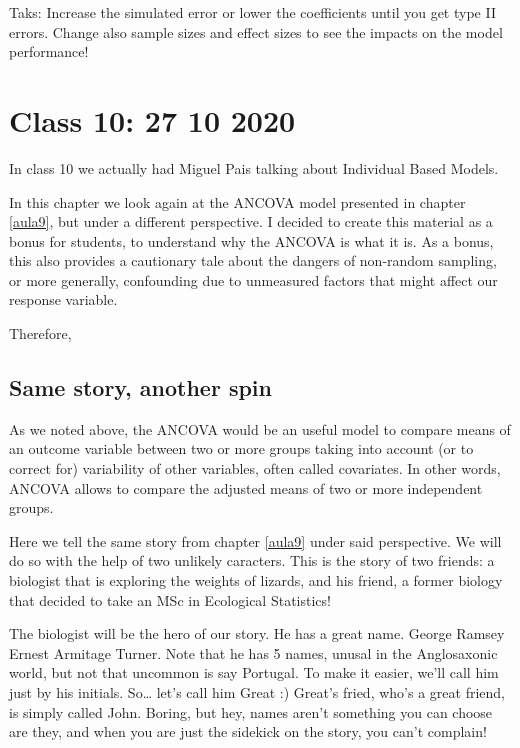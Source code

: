 \documentclass[
]{book}
\begin{document}
Taks: Increase the simulated error or lower the coefficients until you get type II errors. Change also sample sizes and effect sizes to see the impacts on the model performance!

\hypertarget{aula10}{%
\chapter{Class 10: 27 10 2020}\label{aula10}}

In class 10 we actually had Miguel Pais talking about Individual Based Models.

In this chapter we look again at the ANCOVA model presented in chapter \ref{aula9}, but under a different perspective. I decided to create this material as a bonus for students, to understand why the ANCOVA is what it is. As a bonus, this also provides a cautionary tale about the dangers of non-random sampling, or more generally, confounding due to unmeasured factors that might affect our response variable.

Therefore,

\hypertarget{same-story-another-spin}{%
\section{Same story, another spin}\label{same-story-another-spin}}

As we noted above, the ANCOVA would be an useful model to compare means of an outcome variable between two or more groups taking into account (or to correct for) variability of other variables, often called covariates. In other words, ANCOVA allows to compare the adjusted means of two or more independent groups.

Here we tell the same story from chapter \ref{aula9} under said perspective. We will do so with the help of two unlikely caracters. This is the story of two friends: a biologist that is exploring the weights of lizards, and his friend, a former biology that decided to take an MSc in Ecological Statistics!

The biologist will be the hero of our story. He has a great name. George Ramsey Ernest Armitage Turner. Note that he has 5 names, unusal in the Anglosaxonic world, but not that uncommon is say Portugal. To make it easier, we'll call him just by his initials. So\ldots{} let's call him Great :) Great's fried, who's a great friend, is simply called John. Boring, but hey, names aren't something you can choose are they, and when you are just the sidekick on the story, you can't complain!
\end{document}
